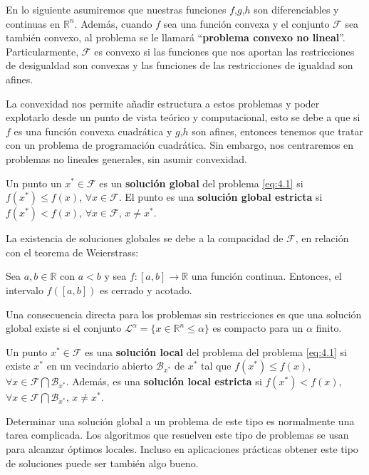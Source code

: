 En lo siguiente asumiremos que nuestras funciones $f$,$g$,$h$ son diferenciables y continuas en $\mathbb{R}^n$. 
Además, cuando $f$ sea una función convexa y el conjunto $\mathcal{F}$ sea también convexo, al problema se le llamará ``\textbf{problema convexo no lineal}''. 
Particularmente, $\mathcal{F}$ es convexo si las funciones que nos aportan las restricciones de desigualdad son convexas y las funciones de las restricciones de igualdad son afines.

La convexidad nos permite añadir estructura a estos problemas y poder explotarlo desde un punto de vista teórico y computacional, esto se debe a que si $f$ es una función convexa cuadrática y $g$,$h$ son afines, entonces tenemos que tratar con un problema de programación cuadrática. 
Sin embargo, nos centraremos en problemas no lineales generales, sin asumir convexidad.

\begin{definicion}
Un punto un $x^*\in\mathcal{F}$ es un \textbf{solución global} del problema \ref{eq:4.1} si $f(x^*)\leq f(x)$, $\forall x\in\mathcal{F}$. El punto es una \textbf{solución global estricta} si $f(x^*) < f(x)$, $\forall x\in\mathcal{F}$, $x\neq x^*$.
\end{definicion}

La existencia de soluciones globales se debe a la compacidad de $\mathcal{F}$, en relación con el teorema de Weierstrass:

\begin{teorema}
Sea $a,b\in\mathbb{R}$ con $a<b$ y sea $f:[a,b]\xrightarrow{}{}\mathbb{R}$ una función continua. 
Entonces, el intervalo $f([a,b])$ es cerrado y acotado.
\end{teorema}

Una consecuencia directa para los problemas sin restricciones es que una solución global existe si el conjunto $\mathcal{L}^\alpha = \{x\in\mathbb{R}^n\leq\alpha\}$ es compacto para un $\alpha$ finito. 

\begin{definicion}
Un punto $x^*\in\mathcal{F}$ es una \textbf{solución local} del problema del problema \ref{eq:4.1} si existe $x^*$ en un vecindario abierto $\mathcal{B}_{x^*}$ de $x^*$ tal que $f(x^*)\leq f(x)$, $\forall x\in \mathcal{F}\bigcap\mathcal{B}_{x^*}$. 
Además, es una \textbf{solución local estricta} si $f(x^*)<f(x)$, $\forall x\in\mathcal{F}\bigcap\mathcal{B}_{x^*}$, $x\neq x^*$.
\end{definicion}

Determinar una solución global a un problema de este tipo es normalmente una tarea complicada. 
Los algoritmos que resuelven este tipo de problemas se usan para alcanzar óptimos locales. 
Incluso en aplicaciones prácticas obtener este tipo de soluciones puede ser también algo bueno. 

